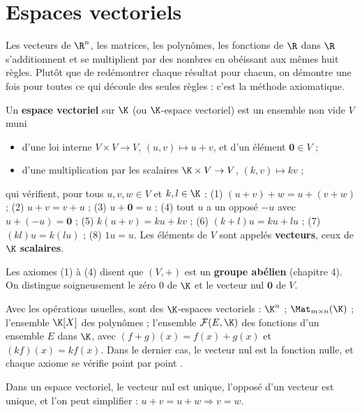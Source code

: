 \section{Espaces vectoriels}
\begin{intuition}
Les vecteurs de $\R^n$, les matrices, les polynômes, les fonctions de $\R$ dans $\R$ s'additionnent et se multiplient par des nombres en obéissant aux mêmes huit règles. Plutôt que de redémontrer chaque résultat pour chacun, on démontre une fois pour toutes ce qui découle des seules règles : c'est la méthode axiomatique.
\end{intuition}
\begin{definition}\label{def-ev}
Un \textbf{espace vectoriel} sur $\K$ (ou $\K$-espace vectoriel) est un ensemble non vide $V$ muni
\begin{itemize}
\item d'une loi interne $V\times V\to V$, $(u,v)\mapsto u+v$, et d'un élément $\mathbf 0\in V$ ;
\item d'une multiplication par les scalaires $\K\times V\to V$, $(k,v)\mapsto kv$ ;
\end{itemize}
qui vérifient, pour tous $u,v,w\in V$ et $k,l\in\K$ : (1) $(u+v)+w=u+(v+w)$ ; (2) $u+v=v+u$ ; (3) $u+\mathbf 0=u$ ; (4) tout $u$ a un opposé $-u$ avec $u+(-u)=\mathbf 0$ ; (5) $k(u+v)=ku+kv$ ; (6) $(k+l)u=ku+lu$ ; (7) $(kl)u=k(lu)$ ; (8) $1u=u$. Les éléments de $V$ sont appelés \textbf{vecteurs}, ceux de $\K$ \textbf{scalaires}.
\end{definition}
\begin{remarque}
Les axiomes (1) à (4) disent que $(V,+)$ est un \textbf{groupe abélien} (chapitre 4). On distingue soigneusement le zéro $0$ de $\K$ et le vecteur nul $\mathbf 0$ de $V$.
\end{remarque}
\begin{exemple}
Avec les opérations usuelles, sont des $\K$-espaces vectoriels : $\K^n$ ; $\Mat_{m\times n}(\K)$ ; l'ensemble $\K[X]$ des polynômes ; l'ensemble $\mathcal F(E,\K)$ des fonctions d'un ensemble $E$ dans $\K$, avec $(f+g)(x)=f(x)+g(x)$ et $(kf)(x)=kf(x)$. Dans le dernier cas, le vecteur nul est la fonction nulle, et chaque axiome se vérifie \og point par point \fg.
\end{exemple}
\begin{proposition}[Unicités]
Dans un espace vectoriel, le vecteur nul est unique, l'opposé d'un vecteur est unique, et l'on peut simplifier : $u+v=u+w\Rightarrow v=w$.
\end{proposition}
